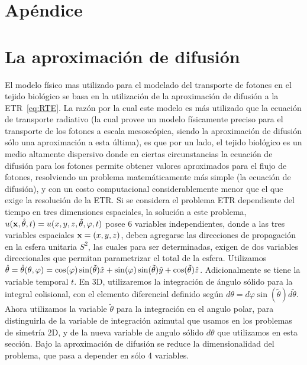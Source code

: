 \pagestyle{fancy}
\chapter*{Apéndice}
\lhead{\thepage}
\vspace{0.01\textheight}
\chapter{La aproximación de difusión}
\label{ap:ecdiff}

El modelo físico mas utilizado para el modelado del transporte de fotones en el 
tejido biológico se basa en la utilización de la aproximación de 
difusión a la ETR~\eqref{eq:RTE}. La razón por la cual este modelo es más utilizado 
que la ecuación de transporte radiativo (la cual 
provee un modelo físicamente preciso para el transporte de los fotones a escala mesoscópica, 
siendo la aproximación de difusión sólo una aproximación a esta última), es que 
por un lado, el tejido biológico es un medio 
altamente dispersivo donde en ciertas circunstancias la ecuación de difusión para los fotones permite obtener valores aproximados para el flujo de fotones, resolviendo un problema matemáticamente 
más simple (la ecuación de difusión), y con un costo computacional 
considerablemente menor que el que exige la resolución de la ETR. 
Si se considera el problema ETR dependiente del tiempo 
en tres dimensiones espaciales, la solución a este problema, $u(\mathbf{x},\hat{\theta},t)=u(x,y,z,\tilde{\theta},\varphi,t)$  
posee 6 variables independientes, donde a las tres variables espaciales $\mathbf{x}=(x,y,z)$, 
deben agregarse las direcciones de propagación en la esfera unitaria $S^2$, las 
cuales para ser determinadas, exigen de dos variables direccionales que permitan 
parametrizar el total de la esfera. Utilizamos $\hat{\theta}=\hat{\theta}(\theta,\varphi)=\cos(\varphi)\sin(\tilde{\theta})\hat x+\sin(\varphi)\sin(\tilde{\theta})\hat y+\cos(\tilde{\theta}) \hat z$. Adicionalmente se tiene la variable temporal $t$. En 3D, utilizaremos 
la integración de ángulo sólido para la integral colisional, con el elemento diferencial definido según 
$d\theta= d\varphi \sin(\tilde{\theta}) d\tilde{\theta}$. Ahora utilizamos la variable $\tilde{\theta}$ para la integración en el angulo polar, 
para distinguirla de la variable de integración azimutal que usamos en los problemas de simetría 2D, y de la nueva variable de angulo sólido $d\theta$ que utilizamos en esta sección. Bajo la aproximación 
de difusión se reduce la dimensionalidad del problema, que pasa a depender en sólo 4 variables. 
